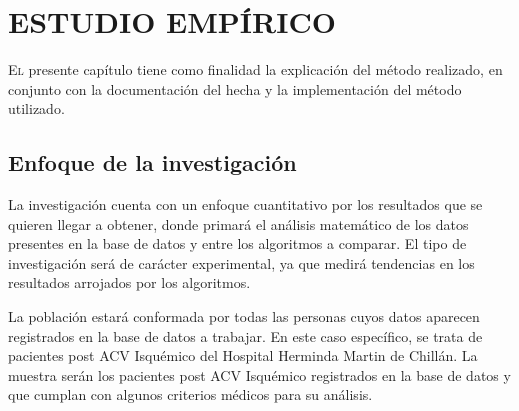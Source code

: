\doublespacing
\chapter{ESTUDIO EMPÍRICO}

\lettrine[lines=4, slope=0.2em, findent=0.2em, nindent=0.6em]{E}
l presente capítulo tiene como finalidad la explicación del método realizado, en conjunto con la documentación del hecha y la implementación del método utilizado.\\


\doublespacing
\section{Enfoque de la investigación}
La investigación cuenta con un enfoque cuantitativo por los resultados que se quieren llegar a obtener, donde primará el análisis matemático de los datos presentes en la base de datos y entre los algoritmos a comparar. El tipo de investigación será de carácter experimental, ya que medirá tendencias en los resultados arrojados por los algoritmos.\\
\par La población estará conformada por todas las personas cuyos datos aparecen registrados en la base de datos a trabajar. En este caso específico, se trata de pacientes post ACV Isquémico del Hospital Herminda Martin de Chillán. La muestra serán los pacientes post ACV Isquémico registrados en la base de datos y que cumplan con algunos criterios médicos para su análisis.\\


\doublespacing
